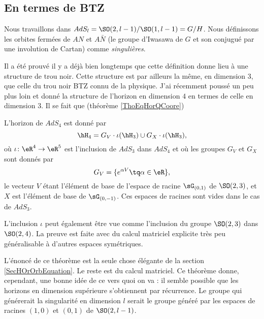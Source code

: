 \subsection{En termes de BTZ}

Nous travaillons dans $AdS_l=\SO(2,l-1)/\SO(1,l-1)=G/H$. Nous définissons les orbites fermées de $AN$ et $A\bar N$ (le groupe d'Iwasawa de $G$ et son conjugué par une involution de Cartan) comme \emph{singulières}.

Il a été prouvé il y a déjà bien longtemps que cette définition donne lieu à une structure de trou noir. Cette structure est par ailleurs la même, en dimension 3, que celle du trou noir BTZ connu de la physique. J'ai récemment poussé un peu plus loin et donné la structure de l'horizon en dimension $4$ en termes de celle en dimension $3$. Il se fait que (théorème \ref{ThoEqHorQCoore})

\begin{theorem}
L'horizon de $AdS_4$ est donné par
\begin{equation}		
	\hH_4=G_V\cdot \iota(\hH_3)\cup G_X\cdot\iota(\hH_3),
\end{equation}
où $\iota\colon \eR^4\to \eR^5$ est l'inclusion de $AdS_3$ dans $AdS_4$ et où les groupes $G_V$ et $G_X$ sont donnés par
\begin{equation}
	G_V=\{  e^{\alpha V}\tq\alpha\in\eR \},
\end{equation}
le vecteur $V$ étant l'élément de base de l'espace de racine $\sG_{(0,1)}$ de $\SO(2,3)$, et $X$ est l'élément de base de $\sG_{(0,-1)}$. Ces espaces de racines sont vides dans le cas de $AdS_3$.
\end{theorem}
L'inclusion $\iota$ peut également être vue comme l'inclusion du groupe $\SO(2,3)$ dans $\SO(2,4)$. La preuve est faite avec du calcul matriciel explicite très peu généralisable à d'autres espaces symétriques.

L'énoncé de ce théorème est la seule chose élégante de la section \ref{SecHOrOrbEquation}. Le reste est du calcul matriciel. Ce théorème donne, cependant, une bonne idée de ce vers quoi on va : il semble possible que les horizons en dimension supérieure s'obtiennent par récurrence. Le groupe qui générerait la singularité en dimension $l$ serait le groupe généré par les espaces de racines $(1,0)$ et $(0,1)$ de $\SO(2,l-1)$.

